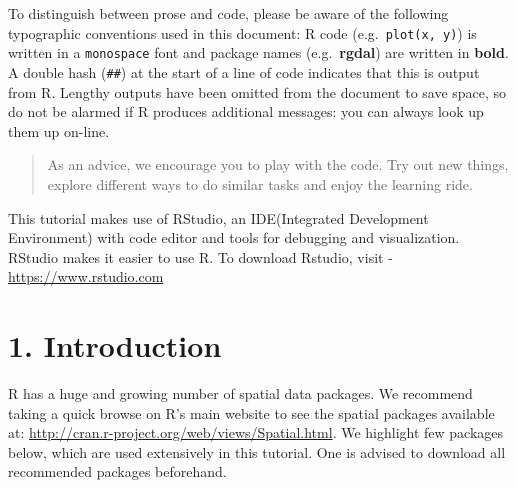 \documentclass[]{article}
\begin{document}
To distinguish between prose and code, please be aware of the following
typographic conventions used in this document: R code
(e.g.~\texttt{plot(x,\ y)}) is written in a \texttt{monospace} font and
package names (e.g.~\textbf{rgdal}) are written in \textbf{bold}. A
double hash (\texttt{\#\#}) at the start of a line of code indicates
that this is output from R. Lengthy outputs have been omitted from the
document to save space, so do not be alarmed if R produces additional
messages: you can always look up them up on-line.

\begin{quote}
As an advice, we encourage you to play with the code. Try out new
things, explore different ways to do similar tasks and enjoy the
learning ride.
\end{quote}

This tutorial makes use of RStudio, an IDE(Integrated Development
Environment) with code editor and tools for debugging and visualization.
RStudio makes it easier to use R. To download Rstudio, visit -
\url{https://www.rstudio.com}

\clearpage

\hypertarget{introduction}{%
\section{1. Introduction}\label{introduction}}

R has a huge and growing number of spatial data packages. We recommend
taking a quick browse on R's main website to see the spatial packages
available at: \url{http://cran.r-project.org/web/views/Spatial.html}. We
highlight few packages below, which are used extensively in this
tutorial. One is advised to download all recommended packages
beforehand.
\end{document}

